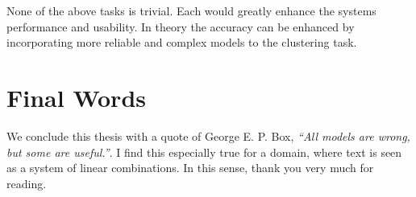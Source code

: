 None of the above tasks is trivial. Each would greatly enhance the systems performance and usability. In theory the accuracy can be enhanced by incorporating more reliable and complex models to the clustering task.

\section{Final Words}

We conclude this thesis with a quote of George E. P. Box, \emph{``All models are wrong, but some are useful.''}. I find this especially true for a domain, where text is seen as a system of linear combinations. In this sense, thank you very much for reading.

